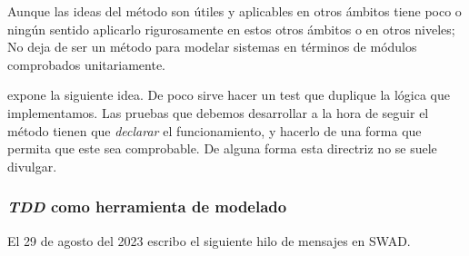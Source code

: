 Aunque las ideas del método son útiles y aplicables en otros ámbitos
tiene poco o ningún sentido aplicarlo rigurosamente en estos otros ámbitos o
en otros niveles; No deja de ser un método para modelar sistemas en
términos de módulos comprobados unitariamente.

\cite{TDD} expone la siguiente idea.
De poco sirve hacer un test que duplique la lógica que implementamos. Las
pruebas que debemos desarrollar a la hora de seguir el método tienen que
\textit{declarar} el funcionamiento, y hacerlo de una forma que permita que
este sea comprobable. De alguna forma esta directriz no se suele divulgar.

\subsubsection{\textit{TDD} como herramienta de modelado}

El 29 de agosto del 2023 escribo el siguiente hilo de mensajes en SWAD.

